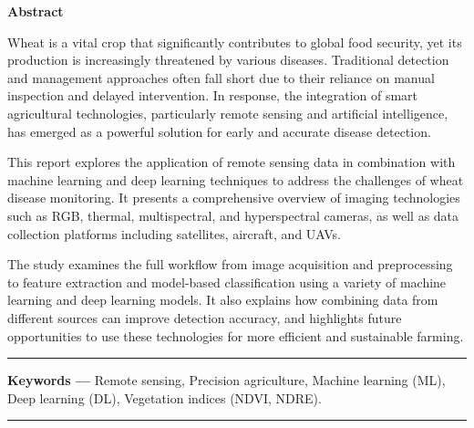 
\thispagestyle{plain}
\setcounter{page}{2}

\noindent
{\Large\bfseries Abstract}

\noindent
Wheat is a vital crop that significantly contributes to global food security, yet its production is increasingly threatened by various diseases. Traditional detection and management approaches often fall short due to their reliance on manual inspection and delayed intervention. In response, the integration of smart agricultural technologies, particularly remote sensing and artificial intelligence, has emerged as a powerful solution for early and accurate disease detection. 

This report explores the application of remote sensing data in combination with machine learning and deep learning techniques to address the challenges of wheat disease monitoring. It presents a comprehensive overview of imaging technologies such as RGB, thermal, multispectral, and hyperspectral cameras, as well as data collection platforms including satellites, aircraft, and UAVs. 

The study examines the full workflow from image acquisition and preprocessing to feature extraction and model-based classification using a variety of machine learning and deep learning models. It also explains how combining data from different sources can improve detection accuracy, and highlights future opportunities to use these technologies for more efficient and sustainable farming.    

\rule{\linewidth}{1pt}
\textbf{Keywords --- } Remote sensing, Precision agriculture, Machine learning (ML), Deep learning (DL), Vegetation indices (NDVI, NDRE).\\
\rule{\linewidth}{1pt}

\newpage

